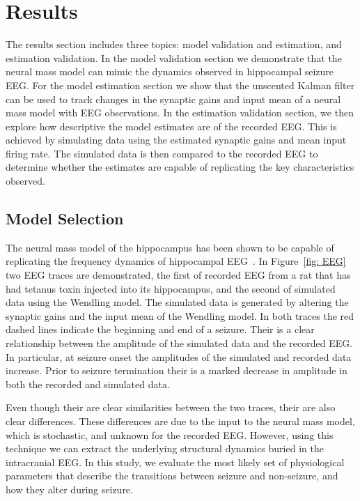 \section{Results}

The results section includes three topics: model validation and estimation, and estimation validation. In the model validation section we demonstrate that the neural mass model can mimic the dynamics observed in hippocampal seizure EEG. For the model estimation section we show that the unscented Kalman filter can be used to track changes in the synaptic gains and input mean of a neural mass model with EEG observations. In the estimation validation section, we then explore how descriptive the model estimates are of the recorded EEG. This is achieved by simulating data using the estimated synaptic gains and mean input firing rate. The simulated data is then compared to the recorded EEG to determine whether the estimates are capable of replicating the key characteristics observed.

\subsection{Model Selection}

The neural mass model of the hippocampus has been shown to be capable of replicating the frequency dynamics of hippocampal EEG~\citep{wendling2002epileptic}. In Figure~\ref{fig: EEG} two EEG traces are demonstrated, the first of recorded EEG from a rat that has had tetanus toxin injected into its hippocampus, and the second of simulated data using the Wendling model. The simulated data is generated by altering the synaptic gains and the input mean of the Wendling model. In both traces the red dashed lines indicate the beginning and end of a seizure. Their is a clear relationship between the amplitude of the simulated data and the recorded EEG. In particular, at seizure onset the amplitudes of the simulated and recorded data increase. Prior to seizure termination their is a marked decrease in amplitude in both the recorded and simulated data.
 
Even though their are clear similarities between the two traces, their are also clear differences. These differences are due to the input to the neural mass model, which is stochastic, and unknown for the recorded EEG. However, using this technique we can extract the underlying structural dynamics buried in the intracranial EEG. In this study, we evaluate the most likely set of physiological parameters that describe the transitions between seizure and non-seizure, and how they alter during seizure.

